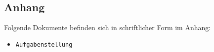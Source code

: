 \newpage
\begin{appendix}
\section{Anhang}
Folgende Dokumente befinden sich in schriftlicher Form im Anhang:

\begin{itemize}
	\item \verb|Aufgabenstellung|
\end{itemize}




\end{appendix}
